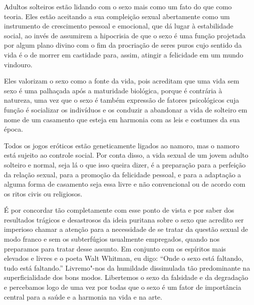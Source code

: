 Adultos solteiros estão lidando com o sexo mais como um fato do que como
teoria. Eles estão aceitando a sua compleição sexual abertamente como um
instrumento de crescimento pessoal e emocional, que dá lugar à
estabilidade social, ao invés de assumirem a hipocrisia de que o sexo é
uma função projetada por algum plano divino com o fim da procriação de
seres puros cujo sentido da vida é o de morrer em castidade para, assim,
atingir a felicidade em um mundo vindouro.

Eles valorizam o sexo como a fonte da vida, pois acreditam que uma vida
sem sexo é uma palhaçada após a maturidade biológica, porque é contrária
à natureza, uma vez que o sexo é também expressão de fatores
psicológicos cuja função é socializar os indivíduos e os conduzir a
abandonar a vida de solteiro em nome de um casamento que esteja em
harmonia com as leis e costumes da sua época.

Todos os jogos eróticos estão geneticamente ligados ao namoro, mas o
namoro está sujeito ao controle social. Por conta disso, a vida sexual
de um jovem adulto solteiro e normal, seja lá o que isso queira dizer, é
a preparação para a perfeição da relação sexual, para a promoção da
felicidade pessoal, e para a adaptação a alguma forma de casamento seja
essa livre e não convencional ou de acordo com os ritos civis ou
religiosos.

É por concordar tão completamente com esse ponto de vista e por saber dos
resultados trágicos e desastrosos da ideia puritana sobre o sexo que
acredito ser imperioso chamar a atenção para a necessidade de se tratar
da questão sexual de modo franco e sem os subterfúgios usualmente
empregados, quando nos preparamos para tratar desse assunto. Em conjunto
com os espíritos mais elevados e livres e o poeta Walt Whitman, eu digo:
``Onde o sexo está faltando, tudo está faltando.'' Livremo"-nos da
humildade dissimulada tão predominante na superficialidade dos bons
modos. Libertemos o sexo da falsidade e da degradação e percebamos logo
de uma vez por todas que o sexo é um fator de importância central para a
saúde e a harmonia na vida e na arte.


